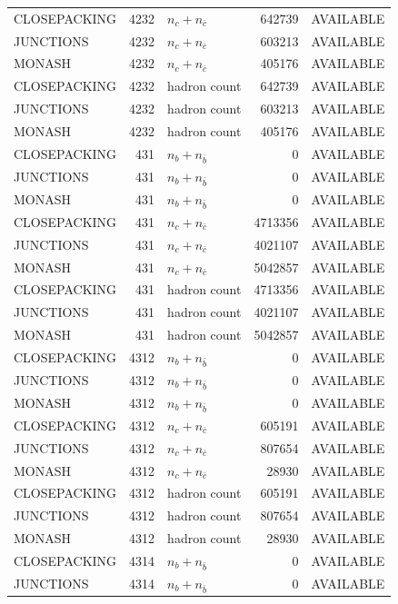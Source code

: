 \begin{landscape}
\begin{longtable}{@{}lrlrl@{}}
CLOSEPACKING & 4232 & $n_c+n_{\bar c}$ & \num{642739} & AVAILABLE \\
JUNCTIONS & 4232 & $n_c+n_{\bar c}$ & \num{603213} & AVAILABLE \\
MONASH & 4232 & $n_c+n_{\bar c}$ & \num{405176} & AVAILABLE \\
CLOSEPACKING & 4232 & hadron count & \num{642739} & AVAILABLE \\
JUNCTIONS & 4232 & hadron count & \num{603213} & AVAILABLE \\
MONASH & 4232 & hadron count & \num{405176} & AVAILABLE \\
CLOSEPACKING & 431 & $n_b+n_{\bar b}$ & \num{0} & AVAILABLE \\
JUNCTIONS & 431 & $n_b+n_{\bar b}$ & \num{0} & AVAILABLE \\
MONASH & 431 & $n_b+n_{\bar b}$ & \num{0} & AVAILABLE \\
CLOSEPACKING & 431 & $n_c+n_{\bar c}$ & \num{4713356} & AVAILABLE \\
JUNCTIONS & 431 & $n_c+n_{\bar c}$ & \num{4021107} & AVAILABLE \\
MONASH & 431 & $n_c+n_{\bar c}$ & \num{5042857} & AVAILABLE \\
CLOSEPACKING & 431 & hadron count & \num{4713356} & AVAILABLE \\
JUNCTIONS & 431 & hadron count & \num{4021107} & AVAILABLE \\
MONASH & 431 & hadron count & \num{5042857} & AVAILABLE \\
CLOSEPACKING & 4312 & $n_b+n_{\bar b}$ & \num{0} & AVAILABLE \\
JUNCTIONS & 4312 & $n_b+n_{\bar b}$ & \num{0} & AVAILABLE \\
MONASH & 4312 & $n_b+n_{\bar b}$ & \num{0} & AVAILABLE \\
CLOSEPACKING & 4312 & $n_c+n_{\bar c}$ & \num{605191} & AVAILABLE \\
JUNCTIONS & 4312 & $n_c+n_{\bar c}$ & \num{807654} & AVAILABLE \\
MONASH & 4312 & $n_c+n_{\bar c}$ & \num{28930} & AVAILABLE \\
CLOSEPACKING & 4312 & hadron count & \num{605191} & AVAILABLE \\
JUNCTIONS & 4312 & hadron count & \num{807654} & AVAILABLE \\
MONASH & 4312 & hadron count & \num{28930} & AVAILABLE \\
CLOSEPACKING & 4314 & $n_b+n_{\bar b}$ & \num{0} & AVAILABLE \\
JUNCTIONS & 4314 & $n_b+n_{\bar b}$ & \num{0} & AVAILABLE \\

\end{longtable}
\end{landscape}

